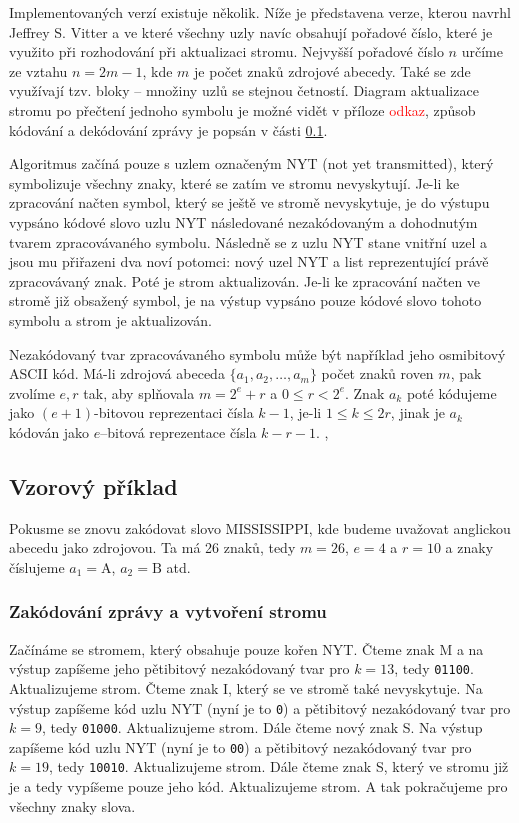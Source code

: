 Implementovaných verzí existuje několik. Níže je představena verze, kterou navrhl Jeffrey S. Vitter a ve které všechny uzly navíc obsahují pořadové číslo, které je využito při rozhodování při aktualizaci stromu. Nejvyšší pořadové číslo $n$ určíme ze vztahu $n = 2m -1$, kde $m$ je počet znaků zdrojové abecedy. Také se zde využívají tzv. bloky -- množiny uzlů se stejnou četností. Diagram aktualizace stromu po přečtení jednoho symbolu je možné vidět v příloze \textcolor{red}{odkaz}, způsob kódování a dekódování zprávy je popsán v části \ref{prikladAdaptivniHuffman}.

Algoritmus začíná pouze s uzlem označeným NYT (not yet transmitted), který symbolizuje všechny znaky, které se zatím ve stromu nevyskytují. Je-li ke zpracování načten symbol, který se ještě ve stromě nevyskytuje, je do výstupu vypsáno kódové slovo uzlu NYT následované nezakódovaným a dohodnutým tvarem zpracovávaného symbolu. Následně se z uzlu NYT stane vnitřní uzel a jsou mu přiřazeni dva noví potomci: nový uzel NYT a list reprezentující právě zpracovávaný znak. Poté je strom aktualizován. Je-li ke zpracování načten ve stromě již obsažený symbol, je na výstup vypsáno pouze kódové slovo tohoto symbolu a strom je aktualizován.

Nezakódovaný tvar zpracovávaného symbolu může být například jeho osmibitový ASCII kód. Má-li zdrojová abeceda $\{a_1, a_2, \ldots, a_m\}$ počet znaků roven $m$, pak zvolíme $e,r$ tak, aby splňovala $m= 2^e + r$ a $0 \leq r < 2^e$. Znak $a_k$ poté kódujeme jako $(e+1)$-bitovou reprezentaci čísla $k-1$, je-li $1 \leq k \leq 2r$, jinak je $a_k$ kódován jako $e$--bitová reprezentace čísla $k-r-1$. \cite{dataCompression}, \cite{introductionToDataCompression}

\subsection{Vzorový příklad}
\label{prikladAdaptivniHuffman}
Pokusme se znovu zakódovat slovo MISSISSIPPI, kde budeme uvažovat anglickou abecedu jako zdrojovou. Ta má 26 znaků, tedy $m=26$, $e = 4$ a $r=10$ a znaky číslujeme $a_1 = \mathrm{A}$, $a_2 = \mathrm{B}$ atd.

\subsubsection{Zakódování zprávy a vytvoření stromu}
Začínáme se stromem, který obsahuje pouze kořen NYT. Čteme znak M a na výstup zapíšeme jeho pětibitový nezakódovaný tvar pro $k=13$, tedy \texttt{01100}. Aktualizujeme strom. Čteme znak I, který se ve stromě také nevyskytuje. Na výstup zapíšeme kód uzlu NYT (nyní je to \texttt{0}) a pětibitový nezakódovaný tvar pro $k=9$, tedy \texttt{01000}. Aktualizujeme strom. Dále čteme nový znak S. Na výstup zapíšeme kód uzlu NYT (nyní je to \texttt{00}) a pětibitový nezakódovaný tvar pro $k=19$, tedy \texttt{10010}. Aktualizujeme strom. Dále čteme znak S, který ve stromu již je a tedy vypíšeme pouze jeho kód. Aktualizujeme strom. A tak pokračujeme pro všechny znaky slova.

